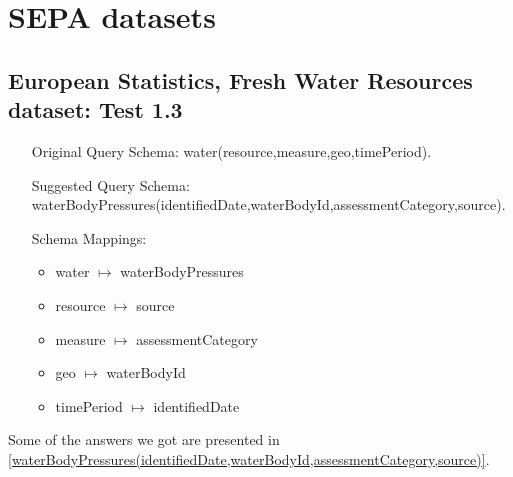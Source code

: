 \documentclass[a4paper,10pt]{article}
\begin{document}
\appendix
\section{SEPA datasets}
\subsection{European Statistics, Fresh Water Resources dataset: Test 1.3}
\label{Test 1.3}

\begin{itemize}
\item[Original Query Schema:] water(resource,measure,geo,timePeriod).
\item[Suggested Query Schema: ]
waterBodyPressures(identifiedDate,waterBodyId,assessmentCategory,source).
\item[Schema Mappings:] 
		\begin{itemize}
		\item water $\mapsto$ waterBodyPressures
\item resource $\mapsto$ source
\item measure $\mapsto$ assessmentCategory
\item geo $\mapsto$ waterBodyId
\item timePeriod $\mapsto$ identifiedDate
\end{itemize}
		\end{itemize}
		

Some of the answers we got are presented in  \ref{waterBodyPressures(identifiedDate,waterBodyId,assessmentCategory,source)}.
\end{document}
